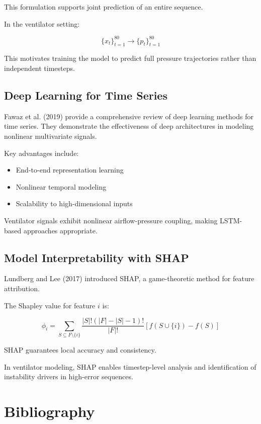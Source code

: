 \documentclass[12pt,a4paper]{report}
\begin{document}
	This formulation supports joint prediction of an entire sequence.
	
	In the ventilator setting:
	
	\[
	\{x_t\}_{t=1}^{80} \rightarrow \{p_t\}_{t=1}^{80}
	\]
	
	This motivates training the model to predict full pressure trajectories rather than independent timesteps.
	
	\section*{Deep Learning for Time Series}
	
	Fawaz et al. (2019) provide a comprehensive review of deep learning methods for time series. They demonstrate the effectiveness of deep architectures in modeling nonlinear multivariate signals.
	
	Key advantages include:
	
	\begin{itemize}
		\item End-to-end representation learning
		\item Nonlinear temporal modeling
		\item Scalability to high-dimensional inputs
	\end{itemize}
	
	Ventilator signals exhibit nonlinear airflow-pressure coupling, making LSTM-based approaches appropriate.
	
	\section*{Model Interpretability with SHAP}
	
	Lundberg and Lee (2017) introduced SHAP, a game-theoretic method for feature attribution.
	
	The Shapley value for feature $i$ is:
	
	\[
	\phi_i =
	\sum_{S \subseteq F \setminus \{i\}}
	\frac{|S|!(|F|-|S|-1)!}{|F|!}
	\left[
	f(S \cup \{i\}) - f(S)
	\right]
	\]
	
	SHAP guarantees local accuracy and consistency.
	
	In ventilator modeling, SHAP enables timestep-level analysis and identification of instability drivers in high-error sequences.
	
	\chapter*{Bibliography}
	
\end{document}
